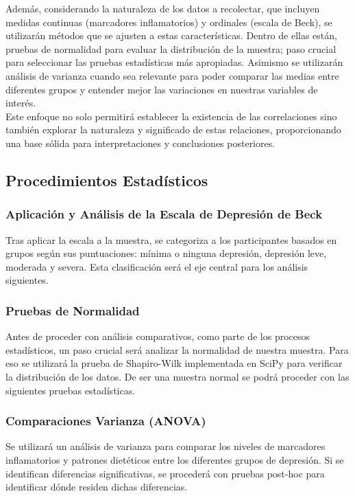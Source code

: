 \documentclass[jou]{apa7}
\begin{document}
	Además, considerando la naturaleza de los datos a recolectar, que
	incluyen medidas continuas (marcadores inflamatorios) y ordinales
	(escala de Beck), se utilizarán métodos que se ajusten a estas
	características. Dentro de ellas están, pruebas de normalidad para
	evaluar la distribución de la muestra; paso crucial para seleccionar las
	pruebas estadísticas más apropiadas. Asimismo se utilizarán análisis de
	varianza cuando sea relevante para poder comparar las medias entre
	diferentes grupos y entender mejor las variaciones en nuestras variables
	de interés.\\
	
	Este enfoque no solo permitirá establecer la existencia de las
	correlaciones sino también explorar la naturaleza y significado de estas
	relaciones, proporcionando una base sólida para interpretaciones y
	conclusiones posteriores.
	
	\subsection{Procedimientos Estadísticos}\label{procedimientos-estaduxedsticos}
	
	\subsubsection{Aplicación y Análisis de la Escala de Depresión de Beck} 
	Tras aplicar la escala a la muestra, se categoriza a los participantes basados en grupos según sus puntuaciones: mínima o ninguna depresión, depresión leve,
	moderada y severa. Esta clasificación será el eje central para los
	análisis siguientes.\\
	
	
	\subsubsection{Pruebas de Normalidad} 
	Antes de proceder con análisis
	comparativos, como parte de los procesos estadísticos, un paso crucial
	será analizar la normalidad de nuestra muestra. Para eso se utilizará la
	prueba de Shapiro-Wilk implementada en SciPy para verificar la
	distribución de los datos. De ser una muestra normal se podrá proceder
	con las siguientes pruebas estadísticas.\\
	
	
	\subsubsection{Comparaciones Varianza (ANOVA)} Se utilizará un análisis de
	varianza para comparar los niveles de marcadores inflamatorios y
	patrones dietéticos entre los diferentes grupos de depresión. Si se
	identifican diferencias significativas, se procederá con pruebas
	post-hoc para identificar dónde residen dichas diferencias.\\
	
\end{document}
